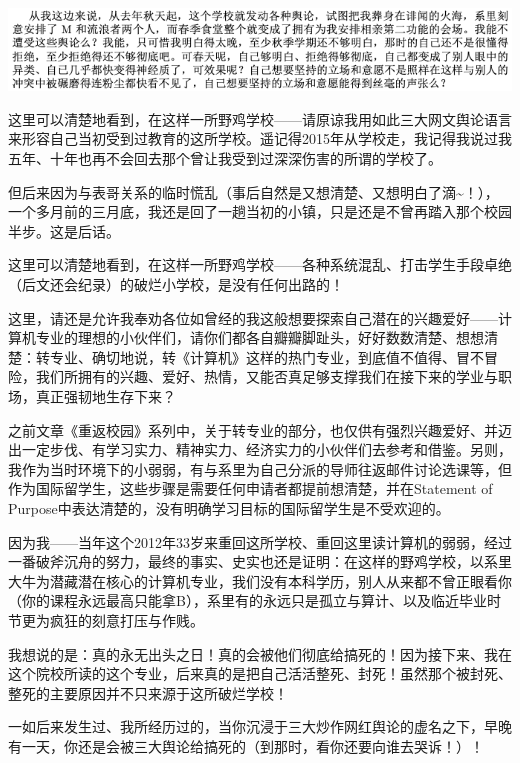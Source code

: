 \documentclass[9pt, b5paper]{article}
\begin{document}
\begin{center}
\includegraphics[width=.9\linewidth]{./pic/backups_plans_20210424_121752.png}
\end{center}

这里可以清楚地看到，在这样一所野鸡学校——请原谅我用如此三大网文舆论语言来形容自己当初受到过教育的这所学校。遥记得2015年从学校走，我记得我说过我五年、十年也再不会回去那个曾让我受到过深深伤害的所谓的学校了。

但后来因为与表哥关系的临时慌乱（事后自然是又想清楚、又想明白了滴\textasciitilde{}！），一个多月前的三月底，我还是回了一趟当初的小镇，只是还是不曾再踏入那个校园半步。这是后话。

这里可以清楚地看到，在这样一所野鸡学校——各种系统混乱、打击学生手段卓绝（后文还会纪录）的破烂小学校，是没有任何出路的！

这里，请还是允许我奉劝各位如曾经的我这般想要探索自己潜在的兴趣爱好——计算机专业的理想的小伙伴们，请你们都各自瓣瓣脚趾头，好好数数清楚、想想清楚：转专业、确切地说，转《计算机》这样的热门专业，到底值不值得、冒不冒险，我们所拥有的兴趣、爱好、热情，又能否真足够支撑我们在接下来的学业与职场，真正强韧地生存下来？

之前文章《重返校园》系列中，关于转专业的部分，也仅供有强烈兴趣爱好、并迈出一定步伐、有学习实力、精神实力、经济实力的小伙伴们去参考和借鉴。另则，我作为当时环境下的小弱弱，有与系里为自己分派的导师往返邮件讨论选课等，但作为国际留学生，这些步骤是需要任何申请者都提前想清楚，并在Statement of Purpose中表达清楚的，没有明确学习目标的国际留学生是不受欢迎的。

因为我——当年这个2012年33岁来重回这所学校、重回这里读计算机的弱弱，经过一番破斧沉舟的努力，最终的事实、史实也还是证明：在这样的野鸡学校，以系里大牛为潜藏潜在核心的计算机专业，我们没有本科学历，别人从来都不曾正眼看你（你的课程永远最高只能拿B），系里有的永远只是孤立与算计、以及临近毕业时节更为疯狂的刻意打压与作贱。

我想说的是：真的永无出头之日！真的会被他们彻底给搞死的！因为接下来、我在这个院校所读的这个专业，后来真的是把自己活活整死、封死！虽然那个被封死、整死的主要原因并不只来源于这所破烂学校！

一如后来发生过、我所经历过的，当你沉浸于三大炒作网红舆论的虚名之下，早晚有一天，你还是会被三大舆论给搞死的（到那时，看你还要向谁去哭诉！）！
\end{document}
